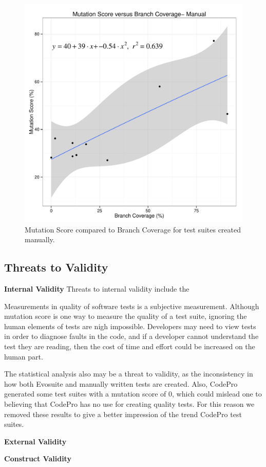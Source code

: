\begin{figure}[!t]
\centering
  \includegraphics[width=\linewidth]{RGraphs/Manual_BranchCov_versus_Mutation_poly.pdf}
    \caption{Mutation Score compared to Branch Coverage for test suites created manually.}
  \label{fig:manual_branch_mutation}
\end{figure}


\subsection{Threats to Validity}
\noindent \textbf{Internal Validity}
Threats to internal validity include the 

Measurements in quality of software tests is a subjective measurement. Although mutation score is one way to measure the quality of a test suite, ignoring the human elements of tests are nigh impossible. Developers may need to view tests in order to diagnose faults in the code, and if a developer cannot understand the test they are reading, then the cost of time and effort could be increased on the human part.

The statistical analysis also may be a threat to validity, as the inconsistency in how both Evosuite and manually written tests are created. Also, CodePro generated some test suites with a mutation score of 0, which could mislead one to believing that CodePro has no use for creating quality tests. For this reason we removed these results to give a better impression of the trend CodePro test suites.

\noindent \textbf{External Validity}

\noindent \textbf{Construct Validity}
